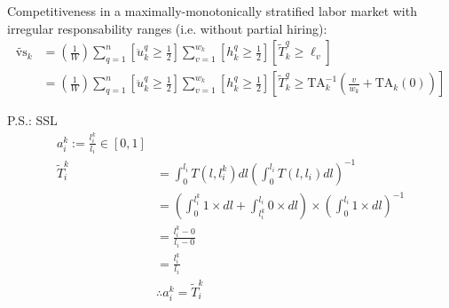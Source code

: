 \documentclass[hidelinks, nonatbib]{elsarticle}
\begin{document}
Competitiveness in a maximally-monotonically stratified labor market with irregular responsability ranges (i.e. without partial hiring):
    \begin{align}
        \tilde{\text{vs}}_k 
        &=
        \left(
            \frac{1}{W}
        \right)
        \sum_{q=1}^{n}
        \left[
            \ddot{u}_{k}^{q}
            \geq
            \frac{1}{2}
        \right]
        \sum_{v=1}^{w_k}
        \left[
            h_{k}^{q}
            \geq
            \frac{1}{2}
        \right]
        \left[
            \tilde{T}_{k}^{q}
            \geq
            \ell_v
        \right]
        \\
        &=
        \left(
            \frac{1}{W}
        \right)
        \sum_{q=1}^{n}
        \left[
            \ddot{u}_{k}^{q}
            \geq
            \frac{1}{2}
        \right]
        \sum_{v=1}^{w_k}
        \left[
            h_{k}^{q}
            \geq
            \frac{1}{2}
        \right]
        \left[
            \tilde{T}_{k}^{q}
            \geq
            \text{TA}_{k}^{-1}
            \left(
                \frac{v}{w_k}
                +
                \text{TA}_{k}(0)
            \right)
        \right]
    \end{align}

    P.S.: SSL
    \begin{align}
        a_{i}^{k} := \frac{l_{i}^{k}}{l_{i}} \in [0,1]
        \\
        \tilde{T}_{i}^{k} 
        &= 
        \int_{0}^{l_i}{
            T(l,l_{i}^{k})
            dl
        }
        \left(
            \int_{0}^{l_i}{
                T(l,l_{i})
                dl
            }
        \right) ^ {-1}
        \\
        &= 
        \left(
            \int_{0}^{l_{i}^{k}}{
                1
                \times
                dl
            }
            +
            \int_{l_{i}^{k}}^{l_i}{
                0
                \times
                dl
            }
        \right)
        \times
        \left(
            \int_{0}^{l_i}{
                1
                \times
                dl
            }
        \right) ^ {-1}
        \\
        &= 
        \frac{l_{i}^{k} - 0}{l_{i} - 0}
        \\
        &= 
        \frac{l_{i}^{k}}{l_{i}}
        \\
        &\therefore
        a_{i}^{k} = \tilde{T}_{i}^{k}
    \end{align}
\end{document}
